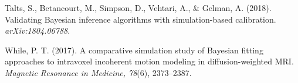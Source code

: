 \documentclass[11pt]{article}
\begin{document}
\begin{list}{}{\setlength{\leftmargin}{1.5em}\setlength{\itemindent}{-1.5em}\setlength{\itemsep}{3pt}}
\item Talts, S., Betancourt, M., Simpson, D., Vehtari, A., \& Gelman, A. (2018).
Validating Bayesian inference algorithms with simulation-based calibration.
\textit{arXiv:1804.06788}.

\item While, P. T. (2017). A comparative simulation study of Bayesian fitting approaches
to intravoxel incoherent motion modeling in diffusion-weighted MRI. \textit{Magnetic
Resonance in Medicine, 78}(6), 2373--2387.

\end{list}
\end{document}
